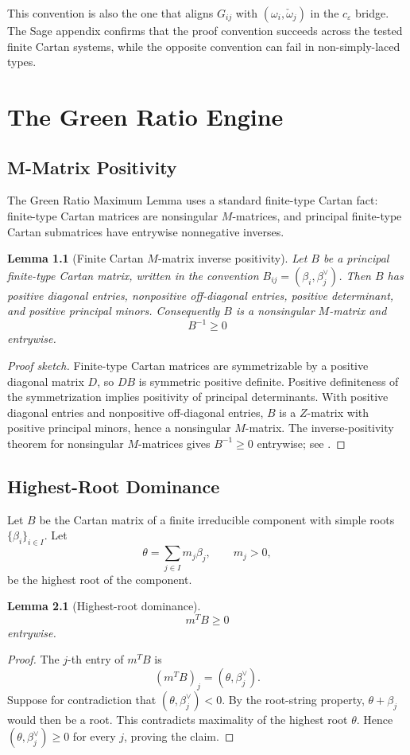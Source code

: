 \documentclass[11pt]{book}
\newtheorem{lemma}[theorem]{Lemma}
\theoremstyle{definition}
\begin{document}
This convention is also the one that aligns $G_{ij}$ with $(\omega_i,\check\omega_j)$ in the $c_\varepsilon$ bridge. The Sage appendix confirms that the proof convention succeeds across the tested finite Cartan systems, while the opposite convention can fail in non-simply-laced types.

\part{The Green Ratio Engine}

\chapter{M-Matrix Positivity}
The Green Ratio Maximum Lemma uses a standard finite-type Cartan fact: finite-type Cartan matrices are nonsingular $M$-matrices, and principal finite-type Cartan submatrices have entrywise nonnegative inverses.

\begin{lemma}[Finite Cartan $M$-matrix inverse positivity]\label{lem:mmatrix}
Let $B$ be a principal finite-type Cartan matrix, written in the convention $B_{ij}=(\beta_i,\beta_j^\vee)$. Then $B$ has positive diagonal entries, nonpositive off-diagonal entries, positive determinant, and positive principal minors. Consequently $B$ is a nonsingular $M$-matrix and
\[
 B^{-1}\ge0
\]
entrywise.
\end{lemma}
\begin{proof}[Proof sketch]
Finite-type Cartan matrices are symmetrizable by a positive diagonal matrix $D$, so $DB$ is symmetric positive definite. Positive definiteness of the symmetrization implies positivity of principal determinants. With positive diagonal entries and nonpositive off-diagonal entries, $B$ is a $Z$-matrix with positive principal minors, hence a nonsingular $M$-matrix. The inverse-positivity theorem for nonsingular $M$-matrices gives $B^{-1}\ge0$ entrywise; see \cite{berman_plemmons,horn_johnson,kac,humphreys}.
\end{proof}

\chapter{Highest-Root Dominance}
Let $B$ be the Cartan matrix of a finite irreducible component with simple roots $\{\beta_i\}_{i\in I}$. Let
\[
 \theta=\sum_{j\in I}m_j\beta_j,\qquad m_j>0,
\]
be the highest root of the component.

\begin{lemma}[Highest-root dominance]\label{lem:highest}
\[
 m^T B\ge0
\]
entrywise.
\end{lemma}
\begin{proof}
The $j$-th entry of $m^T B$ is
\[
 (m^T B)_j=(\theta,\beta_j^\vee).
\]
Suppose for contradiction that $(\theta,\beta_j^\vee)<0$. By the root-string property, $\theta+\beta_j$ would then be a root. This contradicts maximality of the highest root $\theta$. Hence $(\theta,\beta_j^\vee)\ge0$ for every $j$, proving the claim.
\end{proof}
\end{document}
